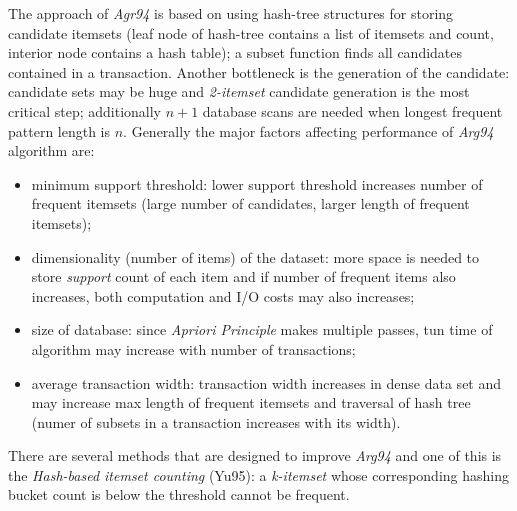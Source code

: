 The approach of \emph{Agr94} is based on using hash-tree structures for storing candidate itemsets (leaf node of hash-tree contains a list of itemsets and count, interior node contains a hash table); a subset function finds all candidates contained in a transaction.
Another bottleneck is the generation of the candidate: candidate sets may be huge and \emph{2-itemset} candidate generation is the most critical step; additionally $n + 1$ database scans are needed when longest frequent pattern length is $n$.
Generally the major factors affecting performance of \emph{Arg94} algorithm are:
\begin{itemize}
	\item
	minimum support threshold: lower support threshold increases number of frequent itemsets (large number of candidates, larger length of frequent itemsets);
	\item dimensionality (number of items) of the dataset: more space is needed to store \emph{support} count of each item and if number of frequent items also increases, both computation and I/O costs may also increases;
	\item
	size of database: since \emph{Apriori Principle} makes multiple passes, tun time of algorithm may increase with number of transactions;
	\item
	average transaction width: transaction width increases in dense data set and may increase max length of frequent itemsets and traversal of hash tree (numer of subsets in a transaction increases with its width).
\end{itemize}

There are several methods that are designed to improve \emph{Arg94} and one of this is the \emph{Hash-based itemset counting} (Yu95): a \emph{k-itemset} whose corresponding hashing bucket count is below the threshold cannot be frequent.

